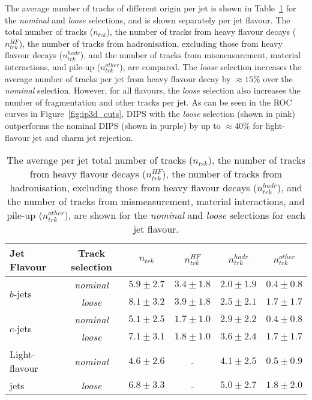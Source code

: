 The average number of tracks of different origin per jet is shown in Table~\ref{table:trkComposition} for the \textit{nominal} and  \textit{loose} selections, and is shown separately per jet flavour. The total number of tracks ($n_{trk}$), the number of tracks from heavy flavour decays ($n_{trk}^{HF}$), the number of tracks from hadronisation, excluding those from heavy flavour decays ($n_{trk}^{hadr}$), and the number of tracks from mismeasurement, material interactions, and pile-up ($n_{trk}^{other}$), are compared. The \textit{loose} selection increases the average number of tracks per jet from heavy flavour decay by $\approx 15\%$ over the \textit{nominal} selection. However, for all flavours, the \textit{loose} selection also increases the number of fragmentation and other tracks per jet.  As can be seen in the ROC curves in Figure~\ref{fig:ip3d_cuts}, DIPS with the \textit{loose} selection (shown in pink) outperforms the nominal DIPS (shown in purple) by up to $\approx 40\%$ for light-flavour jet and charm jet rejection.

\begin{table}[htbp!]
  \begin{center} 
    \begin{tabular}{l | c | c | c | c | c } %
      \textbf{Jet Flavour}         & \textbf{Track selection} & \textbf{$n_{trk}$} & \textbf{$n_{trk}^{HF}$} & \textbf{$n_{trk}^{hadr}$} & \textbf{$n_{trk}^{other}$}     \\
      \hline
      \multirow{2}{*}{$b$-jets} & \textit{nominal}      &  $5.9\pm2.7$ & $3.4\pm1.8$  & $2.0\pm1.9$ & $0.4\pm0.8$  \\
                                & \textit{loose}          &  $8.1\pm3.2$ &  $3.9\pm1.8$ &  $2.5\pm2.1$ &  $1.7\pm1.7$ \\
      \hline
      \multirow{2}{*}{ $c$-jets} & \textit{nominal}     &  $5.1\pm2.5$  &  $1.7\pm1.0$ & $2.9\pm2.2$ & $0.4\pm0.8$ \\
                                & \textit{loose}         &  $7.1\pm3.1$ &  $1.8\pm1.0$ & $3.6\pm2.4$ &  $1.7\pm1.7$ \\
      \hline
      {  Light-flavour}         & \textit{nominal}     &  $4.6\pm2.6$ &             -          & $4.1\pm2.5$ & $0.5\pm0.9$  \\
      {  jets}                  & \textit{loose}         &  $6.8\pm3.3$ &             -          & $5.0\pm2.7$ & $1.8\pm2.0$ \\
    \end{tabular}
    \caption{The average per jet total number of tracks ($n_{trk}$), the number of tracks from heavy flavour decays ($n_{trk}^{HF}$), the number of tracks from hadronisation, excluding those from heavy flavour decays ($n_{trk}^{hadr}$), and the number of tracks from mismeasurement, material interactions, and pile-up ($n_{trk}^{other}$), are shown for the \textit{nominal} and  \textit{loose} selections for each jet flavour.}
      \label{table:trkComposition}
  \end{center}
\end{table}

